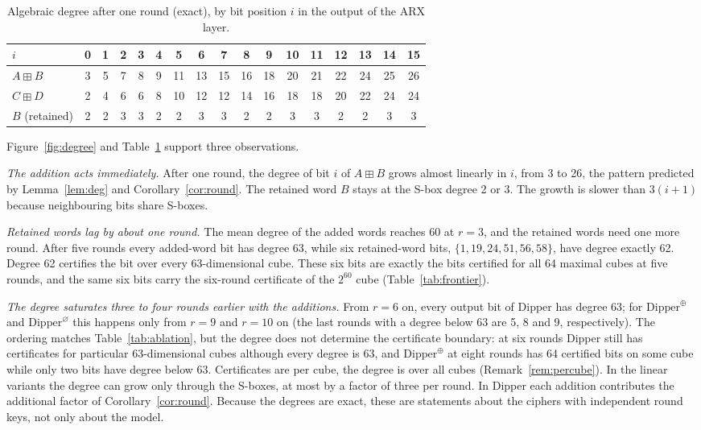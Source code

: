 \documentclass[11pt,a4paper]{article}
\theoremstyle{definition}
\theoremstyle{remark}
\newcommand{\add}{\boxplus}
\begin{document}
\begin{table}[t]\centering
\caption{Algebraic degree after one round (exact), by bit position $i$ in the output of the ARX layer.}\label{tab:deg1}
\setlength{\tabcolsep}{3pt}
\begin{tabular}{l*{16}{c}}
\toprule
$i$ & 0&1&2&3&4&5&6&7&8&9&10&11&12&13&14&15\\
\midrule
$A\add B$ & 3&5&7&8&9&11&13&15&16&18&20&21&22&24&25&26\\
$C\add D$ & 2&4&6&6&8&10&12&12&14&16&18&18&20&22&24&24\\
$B$ (retained) & 2&2&3&3&2&2&3&3&2&2&3&3&2&2&3&3\\
\bottomrule
\end{tabular}
\end{table}

Figure~\ref{fig:degree} and Table~\ref{tab:deg1} support three observations.

\emph{The addition acts immediately.} After one round, the degree of bit $i$ of $A\add B$ grows almost linearly in $i$, from 3 to 26, the pattern predicted by Lemma~\ref{lem:deg} and Corollary~\ref{cor:round}. The retained word $B$ stays at the S-box degree 2 or 3. The growth is slower than $3(i+1)$ because neighbouring bits share S-boxes.

\emph{Retained words lag by about one round.} The mean degree of the added words reaches 60 at $r=3$, and the retained words need one more round. After five rounds every added-word bit has degree 63, while six retained-word bits, $\{1,19,24,51,56,58\}$, have degree exactly 62. Degree 62 certifies the bit over every 63-dimensional cube. These six bits are exactly the bits certified for all 64 maximal cubes at five rounds, and the same six bits carry the six-round certificate of the $2^{60}$ cube (Table~\ref{tab:frontier}).

\emph{The degree saturates three to four rounds earlier with the additions.} From $r=6$ on, every output bit of Dipper has degree 63; for $\mathrm{Dipper}^{\oplus}$ and $\mathrm{Dipper}^{\varnothing}$ this happens only from $r=9$ and $r=10$ on (the last rounds with a degree below 63 are 5, 8 and 9, respectively). The ordering matches Table~\ref{tab:ablation}, but the degree does not determine the certificate boundary: at six rounds Dipper still has certificates for particular 63-dimensional cubes although every degree is 63, and $\mathrm{Dipper}^{\oplus}$ at eight rounds has 64 certified bits on some cube while only two bits have degree below 63. Certificates are per cube, the degree is over all cubes (Remark~\ref{rem:percube}). In the linear variants the degree can grow only through the S-boxes, at most by a factor of three per round. In Dipper each addition contributes the additional factor of Corollary~\ref{cor:round}. Because the degrees are exact, these are statements about the ciphers with independent round keys, not only about the model.
\end{document}
